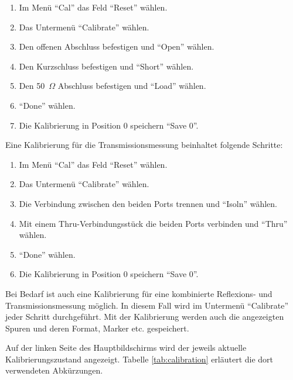 \documentclass[twoside,a4paper,11pt,halfparskip,DIV=11,notitlepage]{scrartcl}
\newcommand{\Ohm}{$\Omega$\xspace}
\begin{document}
\begin{enumerate}
    \item Im Menü ``Cal'' das Feld ``Reset'' wählen.
    \item Das Untermenü ``Calibrate'' wählen.
    \item Den offenen Abschluss befestigen und ``Open'' wählen.
    \item Den Kurzschluss befestigen und ``Short'' wählen.
    \item Den 50~\Ohm Abschluss befestigen und ``Load'' wählen.
    \item ``Done'' wählen.
    \item Die Kalibrierung in Position 0 speichern ``Save 0''.
\end{enumerate}

Eine Kalibrierung für die Transmissionsmessung beinhaltet folgende Schritte:

\begin{enumerate}
    \item Im Menü ``Cal'' das Feld ``Reset'' wählen.
    \item Das Untermenü ``Calibrate'' wählen.
    \item Die Verbindung zwischen den beiden Ports trennen und ``Isoln'' wählen.
    \item Mit einem Thru-Verbindungsstück die beiden Ports verbinden und ``Thru'' wählen.
    \item ``Done'' wählen.
    \item Die Kalibrierung in Position 0 speichern ``Save 0''.
\end{enumerate}

Bei Bedarf ist auch eine Kalibrierung für eine kombinierte Reflexions- und Transmissionsmessung
möglich. In diesem Fall wird im Untermenü ``Calibrate'' jeder Schritt durchgeführt. Mit der
Kalibrierung werden auch die angezeigten Spuren und deren Format, Marker etc. gespeichert.

Auf der linken Seite des Hauptbildschirms wird der jeweils aktuelle Kalibrierungszustand
angezeigt. Tabelle \ref{tab:calibration} erläutert die dort verwendeten Abkürzungen.
\end{document}
